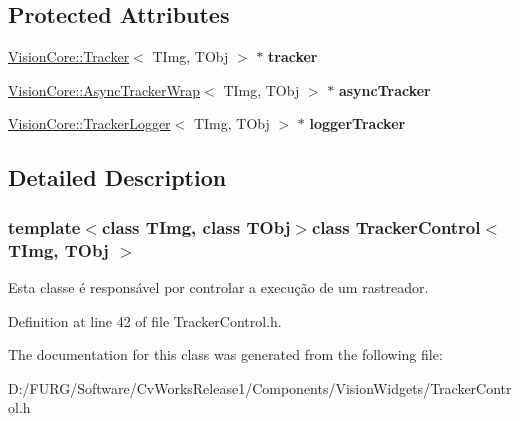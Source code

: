\subsection*{Protected Attributes}
\begin{DoxyCompactItemize}
\item 
\hypertarget{class_tracker_control_a36179771065f91f940d89df6e4b96dd4}{}\hyperlink{class_vision_core_1_1_interfaces_1_1_tracker}{Vision\+Core\+::\+Tracker}$<$ T\+Img, T\+Obj $>$ $\ast$ {\bfseries tracker}\label{class_tracker_control_a36179771065f91f940d89df6e4b96dd4}

\item 
\hypertarget{class_tracker_control_a69179e31455e5c998159f37988a1655a}{}\hyperlink{class_vision_core_1_1_async_1_1_async_tracker_wrap}{Vision\+Core\+::\+Async\+Tracker\+Wrap}$<$ T\+Img, T\+Obj $>$ $\ast$ {\bfseries async\+Tracker}\label{class_tracker_control_a69179e31455e5c998159f37988a1655a}

\item 
\hypertarget{class_tracker_control_a67ad12fda3cb84866231b27bcf7ccd7a}{}\hyperlink{class_vision_core_1_1_abstractions_1_1_tracker_logger}{Vision\+Core\+::\+Tracker\+Logger}$<$ T\+Img, T\+Obj $>$ $\ast$ {\bfseries logger\+Tracker}\label{class_tracker_control_a67ad12fda3cb84866231b27bcf7ccd7a}

\end{DoxyCompactItemize}


\subsection{Detailed Description}
\subsubsection*{template$<$class T\+Img, class T\+Obj$>$class Tracker\+Control$<$ T\+Img, T\+Obj $>$}

Esta classe é responsável por controlar a execução de um rastreador. 

Definition at line 42 of file Tracker\+Control.\+h.



The documentation for this class was generated from the following file\+:\begin{DoxyCompactItemize}
\item 
D\+:/\+F\+U\+R\+G/\+Software/\+Cv\+Works\+Release1/\+Components/\+Vision\+Widgets/Tracker\+Control.\+h\end{DoxyCompactItemize}
